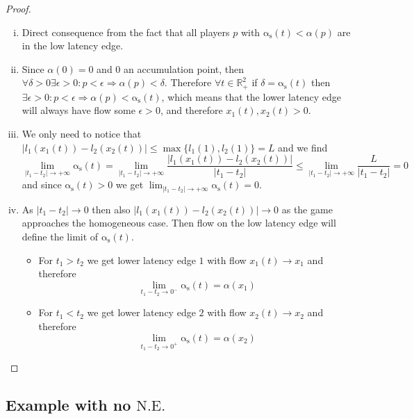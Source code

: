 \documentclass[a4paper,11pt]{article}
\newcommand{\NE}{\mathrm{N.E.}}
\newcommand{\as}{\mathrm{\alpha_s}}
\begin{document}
\begin{proof}
	$ $
	\begin{enumerate}[(i)]
		\item Direct consequence from the fact that all players $p$ with $\as(t) < \alpha(p)$ are in the low latency edge.
		\item Since $\alpha(0) = 0$ and $0$ an accumulation point, then $\forall \delta > 0 \exists \epsilon > 0: p < \epsilon \Rightarrow \alpha(p) < \delta$.
		Therefore $\forall t \in \mathbb{R}_+^2$ if $\delta = \as(t)$ then $\exists \epsilon > 0: p < \epsilon \Rightarrow \alpha(p) < \as(t)$, which means that the lower latency edge will always have flow some $\epsilon > 0$, and therefore $x_1(t), x_2(t) > 0$.
		\item We only need to notice that $|l_1(x_1(t)) - l_2(x_2(t))| \le \max\{l_1(1), l_2(1)\} = L$ and we find
		\[\lim_{|t_1 - t_2| \rightarrow +\infty}\as(t) = \lim_{|t_1 - t_2| \rightarrow +\infty}\frac{|l_1(x_1(t)) - l_2(x_2(t))|}{|t_1 - t_2|} \le \lim_{|t_1 - t_2| \rightarrow +\infty}\frac{L}{|t_1 - t_2|} = 0\]
		and since $\as(t) > 0$ we get $\lim_{|t_1 - t_2| \rightarrow +\infty}\as(t) = 0$.
		\item As $|t_1 - t_2| \rightarrow 0$ then also $|l_1(x_1(t)) - l_2(x_2(t))| \rightarrow 0$ as the game approaches the homogeneous case.
		Then flow on the low latency edge will define the limit of $\as(t)$.
			\begin{itemize}
				\item For $t_1 > t_2$ we get lower latency edge $1$ with flow $x_1(t) \rightarrow x_1$ and therefore
				\[\lim_{t_1 - t_2 \rightarrow 0^-} \as(t) = \alpha(x_1)\]
				\item For $t_1 < t_2$ we get lower latency edge $2$ with flow $x_2(t) \rightarrow x_2$ and therefore
				\[\lim_{t_1 - t_2 \rightarrow 0^+} \as(t) = \alpha(x_2)\]
			\end{itemize}
	\end{enumerate}
\end{proof}

\subsection{Example with no $\NE$}
\end{document}
